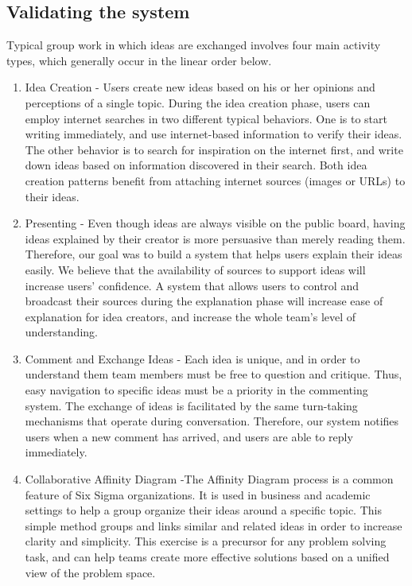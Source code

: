 \documentclass{sigchi}
\begin{document}
\subsection{Validating the system}
Typical group work in which ideas are exchanged involves four main activity types, which generally occur in the linear order below.

\begin{enumerate}
\item Idea Creation - Users create new ideas based on his or her opinions and perceptions of a single topic. During the idea creation phase, users can employ internet searches in two different typical behaviors. One is to start writing immediately, and use internet-based information to verify their ideas. The other behavior is to search for inspiration on the internet first, and write down ideas based on information discovered in their search. Both idea creation patterns benefit from attaching internet sources (images or URLs) to their ideas. 
\item Presenting - Even though ideas are always visible on the public board, having ideas explained by their creator is more persuasive than merely reading them. Therefore, our goal was to build a system that helps users explain their ideas easily. We believe that the availability of sources to support ideas will increase users' confidence. A system that allows users to control and broadcast their sources during the explanation phase will increase ease of explanation for idea creators, and increase the whole team's level of understanding.
\item Comment and Exchange Ideas - Each idea is unique, and in order to understand them team members must be free to question and critique. Thus, easy navigation to specific ideas must be a priority in the commenting system. The exchange of ideas is facilitated by the same turn-taking mechanisms that operate during conversation. Therefore, our system notifies users when a new comment has arrived, and users are able to reply immediately. 
\item Collaborative Affinity Diagram -The Affinity Diagram process is a common feature of Six Sigma organizations. It is used in business and academic settings to help a group organize their ideas around a specific topic. This simple method groups and links similar and related ideas in order to increase clarity and simplicity. This exercise is a precursor for any problem solving task, and can help teams create more effective solutions based on a unified view of the problem space. 
\end{enumerate}
\end{document}
